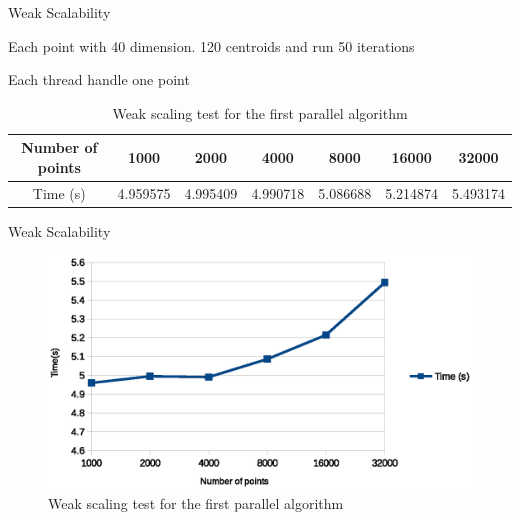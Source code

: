 \documentclass[
nopagebreaks,
style=klope,
fleqn]{powerdot}
\begin{document}
\begin{slide}{Weak Scalability}
  \begin{compactitem}
  \item{Each point with 40 dimension. 120 centroids and run 50 iterations}
  \item{Each thread handle one point}
  \end{compactitem}
  \scriptsize
  \begin{table}[ht]
  \centering
  \begin{tabular}{|c|c|c|c|c|c|c|}
    \hline
    Number of points	& 1000	& 2000	& 4000	& 8000	& 16000	& 32000 \\
    \hline
    Time (s)	 &4.959575	&4.995409	&4.990718	&5.086688	&5.214874	&5.493174\\
    \hline
  \end{tabular}
  \label{tab:weak-scaling}
  \caption{Weak scaling test for the first parallel algorithm}
\end{table}
\end{slide}

\begin{slide}{Weak Scalability}
  \begin{figure}[!h]
    \centering
    \includegraphics[width=\linewidth]{fig/weak_scaling}
    \caption{Weak scaling test for the first parallel algorithm}
    \label{fig:weak_scaling}
  \end{figure}
\end{slide}
\end{document}
